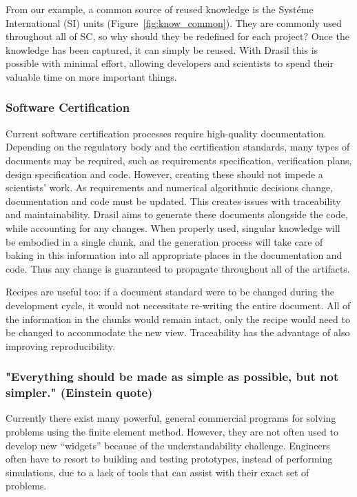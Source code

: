 \documentclass{sig-alternate-05-2015}
\newcommand{\lss}{Drasil}
\begin{document}
From our example, a common source of reused knowledge is the Syst\'{e}me
International (SI) units (Figure~\ref{fig:know_common}). They are commonly
used throughout all of SC, so why should they be redefined for each
project? Once the knowledge has been captured, it can simply be reused.
With \lss{} this is possible with minimal effort, allowing developers and
scientists to spend their valuable time on more important things.

\subsubsection{Software Certification} \label{sssec:adv_cert}

Current software certification processes require high-quality documentation.
Depending on the regulatory body and the certification standards, many
types of documents may be required, such as requirements specification,
verification plans, design specification and code. 
However, creating these should not impede a scientists' work.  As requirements
and numerical algorithmic decisions change, documentation and code must be
updated.  This creates issues with traceability and maintainability.
\lss{} aims to generate these documents alongside the code, while accounting
for any changes. When properly used, singular knowledge will be embodied in
a single chunk, and the generation process will take care of baking in this
information into all appropriate places in the documentation and code.  Thus
any change is guaranteed to propagate throughout all of the artifacts.

Recipes are useful too: if a document standard were to be changed during the
development cycle, it would not necessitate re-writing the entire document. All
of the information in the chunks would remain intact, only the recipe would need
to be changed to accommodate the new view. Traceability has the advantage
of also improving reproducibility.

\subsubsection{"Everything should be made as simple as possible, but not
  simpler."  (Einstein quote)} \label{sssec:adv_simple}

Currently there exist many powerful, general commercial programs for solving
problems using the finite element method. However, they are not often used to
develop new ``widgets'' because of the understandability challenge.
Engineers often have to resort to building and testing prototypes, instead of
performing simulations, due to a lack of tools that can assist with their exact
set of problems. %
\end{document}
